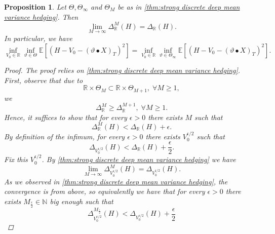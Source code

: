 \documentclass[11pt,a4paper,twoside,openany]{report}
\theoremstyle{plain} %
\newtheorem{proposition}[proposition]{Proposition}
\theoremstyle{definition} %
\theoremstyle{remark} %
\begin{document}
\begin{proposition}
    Let \(\Theta,\Theta_{\infty}\) and \(\Theta_M\) be as in \cref{thm:strong discrete deep mean variance hedging}. Then
    \begin{equation}
        \lim_{M\to\infty}\Delta_{\mathbb{R}}^M(H)=\Delta_{\mathbb{R}}(H).
    \end{equation}
 In particular, we have 
    \begin{equation}
    \inf_{V_0\in\mathbb{R}}\inf_{\vartheta\in\Theta}\mathbb{E}[\left(H-V_0-(\vartheta\bullet X)_T\right)^2]=\inf_{V_0\in\mathbb{R}}\inf_{\vartheta\in\Theta_{\infty}}\mathbb{E}[\left(H-V_0-(\vartheta\bullet X)_T\right)^2].
    \end{equation}
    \begin{proof}
        The proof relies on \cref{thm:strong discrete deep mean variance hedging}. First, observe that due to 
        \begin{equation}
            \mathbb{R}\times\Theta_M\subset \mathbb{R}\times\Theta_{M+1},\;\forall M\geq 1,
        \end{equation}
        we 
        \begin{equation}
            \Delta_{\mathbb{R}}^M\geq \Delta_{\mathbb{R}}^{M+1},\;\forall M\geq 1.
        \end{equation}
        Hence, it suffices to show that for every \(\epsilon>0\) there exists \(M\) such that 
        \begin{equation}
           \Delta_{\mathbb{R}}^M(H)< \Delta_{\mathbb{R}}(H)+\epsilon.
        \end{equation}
        By definition of the infimum, for every \(\epsilon>0\) there exists \(V_0^{\epsilon/2}\) such that 
        \begin{equation}
        \Delta_{V_0^{\epsilon/2}}(H)<\Delta_{\mathbb{R}}(H)+\frac{\epsilon}{2}.
        \end{equation}
        Fix this \(V_0^{\epsilon/2}\). By \cref{thm:strong discrete deep mean variance hedging} we have
        \begin{equation}
            \lim_{M\to\infty}\Delta_{V_0^{\epsilon/2}}^M(H)=\Delta_{V_0^{\epsilon/2}}(H).
        \end{equation}
        As we observed in \cref{thm:strong discrete deep mean variance hedging}, the convergence is from above, so equivalently we have that for every \(\epsilon>0\) there exists \(M_{\frac{\epsilon}{2}}\in\mathbb{N}\) big enough such that
        \begin{equation}
           \Delta^{M_{\frac{\epsilon}{2}}}_{V_0^{\epsilon/2}}(H)< \Delta_{V_0^{\epsilon/2}}(H)+\frac{\epsilon}{2}

\end{equation}
\end{proof}
\end{proposition}
\end{document}
